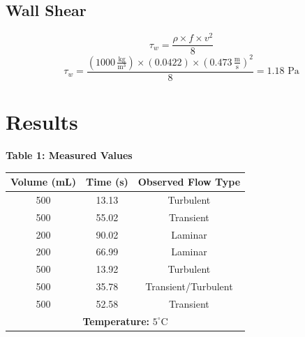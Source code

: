 \documentclass{article}
\begin{document}
\subsection{Wall Shear}
\[\tau_w=\frac{\rho\times f\times v^2}{8}\] 
\[\tau_w=\frac{\left(1000\,\frac{\text{kg}}{\text{m}^3}\right)\times (0.0422)\times \left(0.473\, \frac{\text{m}}{\text{s}}\right)^2}{8}=\boxed{1.18\text{ Pa}}\]
\newpage
\section{Results} 
\begin{center}

    {\large{\bf Table 1: Measured Values\\}}
    \vspace{3mm}
    \begin{tabular}{|ccc|} 
        \hline
        \textbf{Volume (mL)} & \textbf{Time (s)} & \textbf{Observed Flow Type}  \\ 
        \hline
        500                  & 13.13             & Turbulent                      \\
        500                  & 55.02             & Transient                      \\
        200                  & 90.02             & Laminar                        \\
        200                  & 66.99             & Laminar                        \\
        500                  & 13.92             & Turbulent                      \\
        500                  & 35.78             & Transient/Turbulent            \\
        500                  & 52.58             & Transient                      \\\hline
        \multicolumn{3}{|c|}{\textbf{Temperature: } $5^{\circ}$C}\\
        \hline
    \end{tabular}
    \vspace{10mm}


\end{center}
\end{document}
